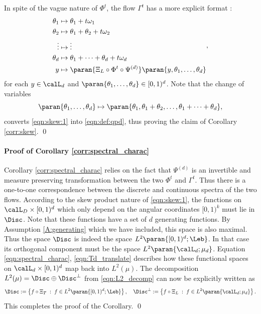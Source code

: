 \documentclass[12pt,oneside]{article}
\newcommand{\Iso}{\Psi}
\newcommand{\IsoInv}{\Xi}
\begin{document}
In spite of the vague nature of $\Phi^t$, the flow $\Gamma^t$ has a more explicit format : 
%
\begin{equation} \label{eqn:skew:1}
	\begin{split}
		\theta_1 &\mapsto \theta_1 + t\omega_1 \\
		\theta_2 &\mapsto \theta_1 + \theta_2 + t\omega_2 \\
		\vdots &\mapsto \vdots \\
		\theta_d &\mapsto \theta_1 + \cdots + \theta_d + t \omega_d \\
		y &\mapsto \paran{\Xi_L \circ \Phi^t \circ \Iso^{(d)}} \paran{ y, \theta_1, \ldots, \theta_d } 
	\end{split} ,
\end{equation}
%
for each $y\in \calL_d$ and $\paran{ \theta_1, \ldots, \theta_d } \in [0,1)^d $. Note that the change of variables 
%
\[ \paran{\theta_1, \ldots, \theta_d} \mapsto \paran{ \theta_1, \theta_1 + \theta_2, \ldots, \theta_1 + \cdots + \theta_d } , \]
%
converts \eqref{eqn:skew:1} into \eqref{eqn:def:qpd}, thus proving the claim of Corollary \ref{corr:skew}. \qed 

\paragraph{Proof of Corollary \ref{corr:spectral_charac}} Corollary \ref{corr:spectral_charac} relies on the fact that $\Iso^{(d)}$ is an invertible and measure preserving transformation between the two $\Phi^t$ and $\Gamma^t$. Thus there is a one-to-one correspondence between the discrete and continuous spectra of the two flows. According to the skew product nature of \eqref{eqn:skew:1}, the functions on $\calL_D \times [0,1)^d$ which only depend on the angular coordinates $[0,1)^k$ must lie in $\Disc$. Note that these functions have a set of $d$ generating functions. By Assumption \ref{A:generating} which we have included, this space is also maximal. Thus the space $\Disc$ is indeed the space $L^2 \paran{ [0,1)^d; \Leb }$. In that case its orthogonal component must be the space $L^2 \paran{ \calL_d; \mu_d }$. Equation \eqref{eqn:spectral_charac}, \eqref{eqn:Td_translate} describes how these functional spaces on $\calL_d\times [0,1)^d$ map back into $L^2(\mu)$. The decomposition $L^2(\mu) = \Disc \oplus \Disc^\bot$ from \eqref{eqn:L2_decomp} can now be explicitly written as 
%
\begin{equation} \label{eqn:spectral_charac}
	\Disc := \left\{ f\circ \IsoInv_T \;:\; f\in L^2 \paran{ [0,1)^d; \Leb } \right\} , \quad \Disc^\bot := \left\{ f\circ\IsoInv_L \;:\; f \in L^2 \paran{ \calL_d; \mu_d } \right\} .
\end{equation}
%
This completes the proof of the Corollary. \qed 
\end{document}
